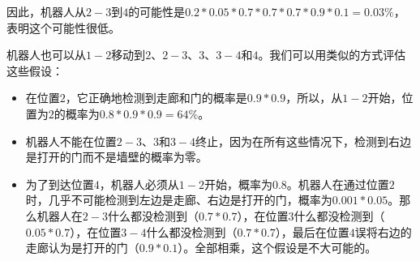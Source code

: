 
因此，机器人从$2-3$到$4$的可能性是$0.2*0.05*0.7*0.7*0.7*0.9*0.1=0.03\%$，表明这个可能性很低。


机器人也可以从$1-2$移动到$2$、$2-3$、$3$、$3-4$和$4$。我们可以用类似的方式评估这些假设：

\begin{itemize}

\item 在位置$2$，它正确地检测到走廊和门的概率是$0.9*0.9$，所以，从$1-2$开始，位置为$2$的概率为$0.8*0.9*0.9=64\%$。
\item 机器人不能在位置$2-3$、$3$和$3-4$终止，因为在所有这些情况下，检测到右边是打开的门而不是墙壁的概率为零。
\item 为了到达位置$4$，机器人必须从$1-2$开始，概率为$0.8$。机器人在通过位置$2$时，几乎不可能检测到左边是走廊、右边是打开的门，概率为$0.001*0.05$。那么机器人在$2-3$什么都没检测到（$0.7*0.7$），在位置$3$什么都没检测到（$0.05*0.7$），在位置$3-4$什么都没检测到（$0.7*0.7$），最后在位置$4$误将右边的走廊认为是打开的门（$0.9*0.1$）。全部相乘，这个假设是不大可能的。
\end{itemize}


